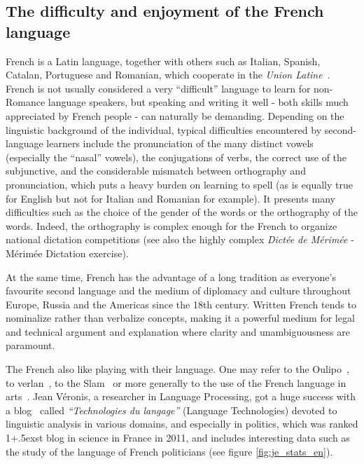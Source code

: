 \begin{multicols}{2}
\subsection{The difficulty and enjoyment of the French language}
French is a Latin language, together with others such as Italian,
Spanish, Catalan, Portuguese and Romanian, which cooperate in the
{\em Union Latine}~\cite{ulatine}. French is not usually considered a very ``difficult''
language to learn for non-Romance language speakers, but speaking and
writing it well - both skills much appreciated by French people - can
naturally be demanding. Depending on the linguistic background of the
individual, typical difficulties encountered by second-language
learners include the pronunciation of the many distinct vowels
(especially the ``nasal'' vowels), the conjugations of verbs, the
correct use of the subjunctive, and the considerable mismatch between
orthography and pronunciation, which puts a heavy burden on learning
to spell (as is equally true for English but not for Italian and
Romanian for example). It presents many difficulties such as the
choice of the gender of the words or the orthography of the
words. Indeed, the orthography is complex enough for the French to
organize national dictation competitions (see also the highly complex
{\em Dictée de Mérimée} - Mérimée Dictation exercise).  

At the same time, French has the advantage of a long tradition as
everyone's favourite second language and the medium of diplomacy and
culture throughout Europe, Russia and the Americas since the 18th
century. Written French tends to nominalize rather than verbalize
concepts, making it a powerful medium for legal and technical argument
and explanation where clarity and unambiguousness are paramount.

The French also like playing with their language. One may refer to the
Oulipo~\cite{oulipo}, to verlan~\cite{plenat95}, to the Slam~\cite{slam} or more generally to the use of the
French language in arts~\cite{arts}. Jean Véronis, a researcher in Language
Processing, got a huge success with a blog~\cite{veronis} called {\em ``Technologies du
langage''} (Language Technologies) devoted to linguistic analysis in various domains, and
especially in politics, which was ranked 1\raise+.5ex\hbox{st} blog in science in France
in 2011, and includes interesting data such as the study of the
language of French politicians (see figure \ref{fig:je_stats_en}).


\end{multicols}
